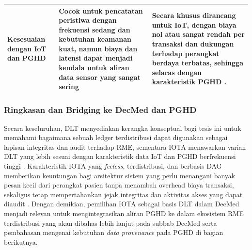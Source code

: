 \begin{table}[h]
\begin{tabular}{p{3cm}p{5.5cm}p{5.5cm}}
    \midrule
    Kesesuaian dengan IoT dan PGHD & Cocok untuk pencatatan peristiwa dengan frekuensi sedang dan kebutuhan keamanan kuat, namun biaya dan latensi dapat menjadi kendala untuk aliran data sensor yang sangat sering \parencite{Ettaloui_2024_blockchain_ehr_slr,Mayer_2020_ehr_blockchain_slr} & Secara khusus dirancang untuk IoT, dengan biaya nol atau sangat rendah per transaksi dan dukungan terhadap perangkat berdaya terbatas, sehingga selaras dengan karakteristik PGHD \parencite{Elevating_2025_iota_ehealth,IOTA_Tangle2_2022}. \\
    \bottomrule
  \end{tabular}
\end{table}

\subsubsection{Ringkasan dan Bridging ke DecMed dan PGHD}

Secara keseluruhan, DLT menyediakan kerangka konseptual bagi tesis ini untuk memahami bagaimana sebuah ledger terdistribusi dapat digunakan sebagai lapisan integritas dan audit terhadap RME, sementara IOTA menawarkan varian DLT yang lebih sesuai dengan karakteristik data IoT dan PGHD berfrekuensi tinggi \parencite{Ettaloui_2024_blockchain_ehr_slr,Elevating_2025_iota_ehealth}. 
Karakteristik IOTA yang \emph{feeless}, terdistribusi, dan berbasis DAG memberikan keuntungan bagi arsitektur sistem yang perlu menangani banyak pesan kecil dari perangkat pasien tanpa menambah overhead biaya transaksi, sekaligus tetap mempertahankan jejak integritas dan aktivitas akses yang dapat diaudit \parencite{Elevating_2025_iota_ehealth,FromTangleToRebased_2024}. 
Dengan demikian, pemilihan IOTA sebagai basis DLT dalam DecMed menjadi relevan untuk mengintegrasikan aliran PGHD ke dalam ekosistem RME terdistribusi yang akan dibahas lebih lanjut pada subbab DecMed serta pembahasan mengenai kebutuhan \emph{data provenance} pada PGHD di bagian berikutnya.